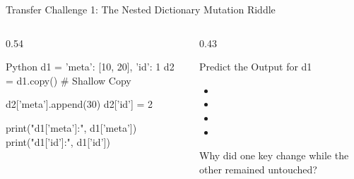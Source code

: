 \begin{frame}[fragile]{Transfer Challenge 1: The Nested Dictionary Mutation Riddle}
  \begin{columns}[T,onlytextwidth]
    \begin{column}{0.54\textwidth}
      \begin{CodeBlock}{Python}
d1 = {'meta': [10, 20], 'id': 1}
d2 = d1.copy()  # Shallow Copy

d2['meta'].append(30)
d2['id'] = 2

print("d1['meta']:", d1['meta'])
print("d1['id']:", d1['id'])
      \end{CodeBlock}
    \end{column}
    \begin{column}{0.43\textwidth}
      \begin{QuestionBox}{Predict the Output for d1}
        \begin{itemize}\setlength{\itemsep}{0.12cm}
          \item[\textbf{A)}] 
          \item[\textbf{B)}] 
          \item[\textbf{C)}] 
          \item[\textbf{D)}] 
        \end{itemize}
      \end{QuestionBox}
      \vspace{0.10cm}
      {\scriptsize\color{UpGradSlate}Why did one key change while the other remained untouched?}
    \end{column}
  \end{columns}
\end{frame}

